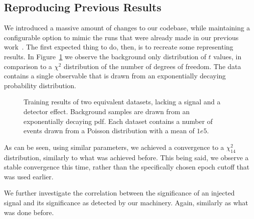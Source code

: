 \documentclass[paper/ddppaper2.tex]{subfiles}
\begin{document}
\subsection{Reproducing Previous Results}
\label{sec:reproduction}

We introduced a massive amount of changes to our codebase, while maintaining a configurable option to mimic the runs that were already made in our previous work~\cite{LastDDPPaper}. The first expected thing to do, then, is to recreate some representing results.
In Figure~\ref{fig:t_distribution_plot_reproduction} we observe the background only distribution of $t$ values, in comparison to a $\chi^2$ distribution of the number of degrees of freedom. The data contains a single observable that is drawn from an exponentially decaying probability distribution.

\begin{figure}
    \caption{Training results of two equivalent datasets, lacking a signal and a detector effect. Background samples are drawn from an exponentially decaying \gls{pdf}. Each dataset contains a number of events drawn from a Poisson distribution with a mean of $1e5$.}
    \label{fig:t_distribution_plot_reproduction}
\end{figure}


As can be seen, using similar parameters, we achieved a convergence to a $\chi^2_{14}$ distribution, similarly to what was achieved before. This being said, we observe a stable convergence this time, rather than the specifically chosen epoch cutoff that was used earlier.

We further investigate the correlation between the significance of an injected signal and its significance as detected by our machinery. Again, similarly as what was done before.

\iftrue %
\par\medskip{}\medskip
\fi %
 
\end{document}
